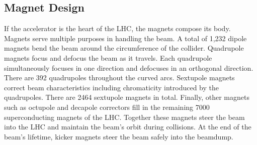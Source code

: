 \subsection{Magnet Design}
If the accelerator is the heart of the LHC, the magnets compose its body.
Magnets serve multiple purposes in handling the beam.
A total of 1,232 dipole magnets bend the beam around the circumference of the collider.
Quadrupole magnets focus and defocus the beam as it travels. Each quadrupole simultaneously focuses in one direction and defocuses in an orthogonal direction. There are 392 quadrupoles throughout the curved arcs.
Sextupole magnets correct beam characteristics including chromaticity introduced by the quadrupoles. There are 2464 sextupole magnets in total.
Finally, other magnets such as octupole and decapole correctors fill in the remaining 7000 superconducting magnets of the LHC.
Together these magnets steer the beam into the LHC and maintain the beam's orbit during collisions.
At the end of the beam's lifetime, kicker magnets steer the beam safely into the beamdump.

